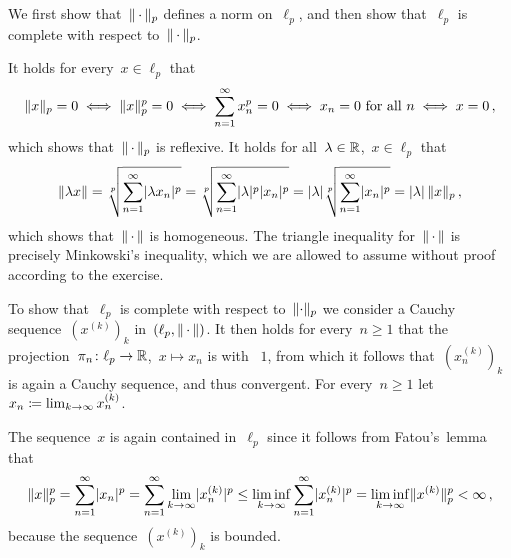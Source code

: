 \section{}





\subsection{}

We first show that~$\lVert\,\cdot\,\rVert_p$ defines a norm on~$\ell_p$, and then show that~$\ell_p$ is complete with respect to~$\lVert\,\cdot\,\rVert_p$.

It holds for every~$x \in \ell_p$ that
\[
        \lVert x\rVert_p = 0
  \iff  \lVert x\rVert_p^p = 0
  \iff  \sum_{n=1}^\infty x_n^p = 0
  \iff  \text{$x_n = 0$ for all~$n$}
  \iff  x = 0 \,,
\]
which shows that~$\lVert\,\cdot\,\rVert_p$ is reflexive.
It holds for all~$\lambda \in \mathbb{R}$,~$x \in \ell_p$ that
\[
    \lVert\lambda x\rVert
  = \sqrt[p]{ \sum_{n=1}^\infty \lvert\lambda x_n\rvert^p }
  = \sqrt[p]{ \sum_{n=1}^\infty \lvert\lambda\rvert^p \lvert x_n\rvert^p }
  = \lvert\lambda\rvert \sqrt[p]{ \sum_{n=1}^\infty \lvert x_n\rvert^p }
  = \lvert\lambda\rvert \, \lVert x\rVert_p \,,
\]
which shows that~$\lVert\,\cdot\,\rVert$ is homogeneous.
The triangle inequality for~$\lVert\,\cdot\,\rVert$ is precisely Minkowski’s inequality, which we are allowed to assume without proof according to the exercise.

To show that~$\ell_p$ is complete with respect to~$\lVert\cdot\rVert_p$ we consider a Cauchy sequence~$(x^{(k)})_k$ in~$(\ell_p, \lVert\,\cdot\,\rVert)$.
It then holds for every~$n \geq 1$ that the projection~$\pi_n \colon \ell_p \to \mathbb{R}$,~$x \mapsto x_n$ is {\lipcont} with {\lipconst}~$1$, from which it follows that~$(x^{(k)}_n)_k$ is again a Cauchy sequence, and thus convergent.
For every~$n \geq 1$ let~$x_n \coloneqq \lim_{k \to \infty} x^{(k)}_n$.

The sequence~$x$ is again contained in~$\ell_p$ since it follows from Fatou’s~lemma that
\[
        \lVert x\rVert_p^p
  =     \sum_{n=1}^\infty \lvert x_n\rvert^p
  =     \sum_{n=1}^\infty \lim_{k \to \infty} \lvert x_n^{(k)}\rvert^p
  \leq  \liminf_{k \to \infty} \sum_{n=1}^\infty \lvert x_n^{(k)}\rvert^p
  =     \liminf_{k \to \infty} \lVert x^{(k)}\rVert_p^p
  <     \infty \,,
\]
because the sequence~$(x^{(k)})_k$ is bounded.

